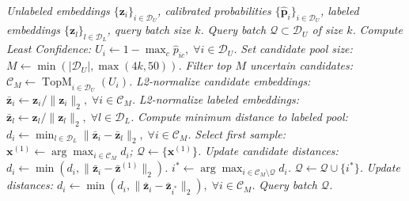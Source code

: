 \documentclass[conference,letterpaper]{IEEEtran}
\begin{document}
\begin{algorithm}[!t]
\caption{Calibrated Candidate-Filtered Diversity Selection}
\label{alg:query_selection}
\begin{algorithmic}[1]
\REQUIRE \textit{Unlabeled embeddings $\{\mathbf{z}_i\}_{i \in \mathcal{D}_U}$, calibrated probabilities $\{\hat{\mathbf{p}}_i\}_{i \in \mathcal{D}_U}$, labeled embeddings $\{\mathbf{z}_l\}_{l \in \mathcal{D}_L}$, query batch size $k$.}
\ENSURE \textit{Query batch $\mathcal{Q} \subset \mathcal{D}_U$ of size $k$.}
\STATE \textit{Compute Least Confidence: $U_i \leftarrow 1 - \max_c \hat{p}_{ic}, \; \forall i \in \mathcal{D}_U$.}
\STATE \textit{Set candidate pool size: $M \leftarrow \min(|\mathcal{D}_U|, \max(4k, 50))$.}
\STATE \textit{Filter top $M$ uncertain candidates: $\mathcal{C}_M \leftarrow \operatorname{TopM}_{i \in \mathcal{D}_U}(U_i)$.}
\STATE \textit{L2-normalize candidate embeddings: $\bar{\mathbf{z}}_i \leftarrow \mathbf{z}_i / \|\mathbf{z}_i\|_2, \; \forall i \in \mathcal{C}_M$.}
\STATE \textit{L2-normalize labeled embeddings: $\bar{\mathbf{z}}_l \leftarrow \mathbf{z}_l / \|\mathbf{z}_l\|_2, \; \forall l \in \mathcal{D}_L$.}
\STATE \textit{Compute minimum distance to labeled pool: $d_i \leftarrow \min_{l \in \mathcal{D}_L} \|\bar{\mathbf{z}}_i - \bar{\mathbf{z}}_l\|_2, \; \forall i \in \mathcal{C}_M$.}
\STATE \textit{Select first sample: $\mathbf{x}^{(1)} \leftarrow \arg\max_{i \in \mathcal{C}_M} d_i$; $\mathcal{Q} \leftarrow \{\mathbf{x}^{(1)}\}$.}
\STATE \textit{Update candidate distances: $d_i \leftarrow \min(d_i, \|\bar{\mathbf{z}}_i - \bar{\mathbf{z}}^{(1)}\|_2)$.}
    \STATE \textit{$i^* \leftarrow \arg\max_{i \in \mathcal{C}_M \setminus \mathcal{Q}} d_i$.}
    \STATE \textit{$\mathcal{Q} \leftarrow \mathcal{Q} \cup \{i^*\}$.}
    \STATE \textit{Update distances: $d_i \leftarrow \min(d_i, \|\bar{\mathbf{z}}_i - \bar{\mathbf{z}}_{i^*}\|_2), \; \forall i \in \mathcal{C}_M$.}
\ENDFOR
\RETURN \textit{Query batch $\mathcal{Q}$.}
\end{algorithmic}
\end{algorithm}
\end{document}
